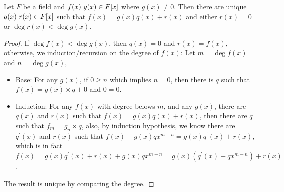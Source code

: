 \documentclass[../main.tex]{subfiles}
\begin{document}
\begin{theorem}
  Let $F$ be a field and $f(x) \ g(x) \in F[x]$ where $g(x) \neq 0$.
  Then there are unique $q(x) \ r(x) \in F[x]$ such that
  $f(x) = g(x)q(x) + r(x)$ and either $r(x) = 0$ or $\deg r(x) < \deg g(x)$.
\end{theorem}
\begin{proof}

  If $\deg f(x) < \deg g(x)$, then $q(x) = 0$ and $r(x) = f(x)$, 
  otherwise, we induction/recursion on the degree of $f(x)$:
  Let $m = \deg f(x)$ and $n = \deg g(x)$,
  \begin{itemize}
    \item Base: For any $g(x)$, if $0 \ge n$ which implies $n = 0$, 
      then there is $q$ such that $f(x) = g(x) \times q + 0$ and $0 = 0$.
    \item Induction: For any $f(x)$ with degree belows $m$, and any $g(x)$,
      there are $q(x)$ and $r(x)$ such that $f(x) = g(x)q(x) + r(x)$,
      then there are $q$ such that $f_m = g_n \times q$, also, by induction hypothesis,
      we know there are $q^\prime(x)$ and $r(x)$ 
      such that $f(x) - g(x)qx^{m - n} = g(x)q^\prime(x) + r(x)$,
      which is in fact $f(x) = g(x)q^\prime(x) + r(x) + g(x) qx^{m - n} = g(x) (q^\prime(x) + qx^{m - n}) + r(x)$.
  \end{itemize}

  The result is unique by comparing the degree.
\end{proof}
\end{document}

